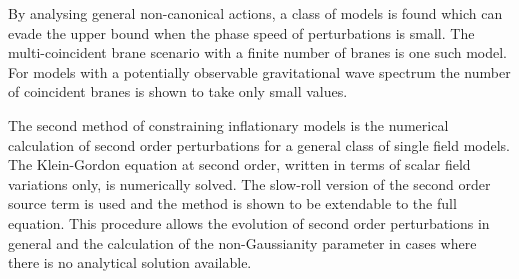 % 
By analysing general non-canonical actions, a class of models is found which can
evade the upper bound when the phase speed of perturbations is small. The multi-coincident brane
scenario with a finite number of branes is one such model. 
For models with a potentially observable gravitational wave spectrum the number of coincident branes
is shown to take only small values. 

The second method of constraining inflationary models is the numerical calculation
of second order perturbations for a general class of single field models.
The Klein-Gordon equation at second order, written in terms
of scalar field variations only, is numerically solved. 
The slow-roll version of the second order source term is used and the method is
shown to be extendable to the full equation.
This procedure allows the evolution of second order
perturbations in general and the calculation of the non-Gaussianity parameter in
cases
where there is no analytical solution available.  


